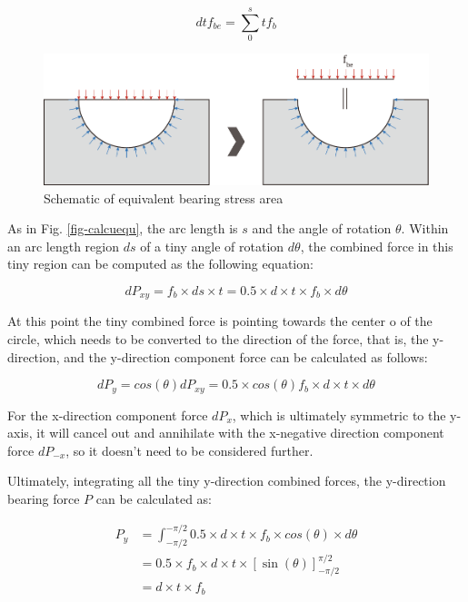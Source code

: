 \begin{equation}
    dtf_{be} = \sum_0^s t f_b
\end{equation}

\begin{figure}
    \centering
    \includegraphics[width=0.8\linewidth]{imgs//app/eqvbea.pdf}
    \caption{Schematic of equivalent bearing stress area}
    \label{fig-eqvbea}
\end{figure}


As in Fig. \ref{fig-calcuequ}, the arc length is $s$ and the angle of rotation $\theta$. Within an arc length region $ds$ of a tiny angle of rotation $d\theta$, the combined force in this tiny region can be computed as the following equation:

\begin{equation*}
    dP_{xy}=f_b \times ds \times t = 0.5 \times d \times t \times f_b \times d\theta
\end{equation*}

At this point the tiny combined force is pointing towards the center o of the circle, which needs to be converted to the direction of the force, that is, the y-direction, and the y-direction component force can be calculated as follows:

\begin{equation*}
    dP_y= cos(\theta) dP_{xy} = 0.5 \times cos(\theta) f_b \times d \times t \times d\theta
\end{equation*}

For the x-direction component force $dP_x$, which is ultimately symmetric to the y-axis, it will cancel out and annihilate with the x-negative direction component force $dP_{-x}$, so it doesn't need to be considered further.

Ultimately, integrating all the tiny y-direction combined forces, the y-direction bearing force $P$ can be calculated as:

\begin{align*}
    P_y &= \int_{-\pi / 2}^{-\pi / 2} 0.5 \times d \times t \times f_b \times cos(\theta) \times d\theta \\
    &=0.5 \times f_b \times d \times t \times[\sin (\theta)]_{-\pi / 2}^{\pi / 2} \\
    &= d \times t \times f_b
\end{align*}

